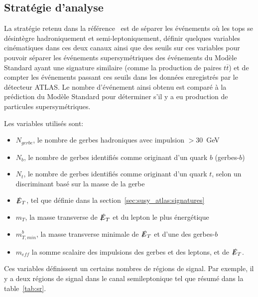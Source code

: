 \subsection{Stratégie d'analyse}
\label{sec:susy_atlas:gtt:strategie}

La stratégie retenu dans la référence~\cite{ATLAS-CONF-2015-067} est
de séparer les événements où les tops se désintègre hadroniquement et
semi-leptoniquement, définir quelques variables cinématiques dans ces
deux canaux ainsi que des seuils sur ces variables pour pouvoir
séparer les événements supersymétriques des événements du Modèle
Standard ayant une signature similaire (comme la production de paires
$t\overline{t}$) et de compter les événements passant ces seuils dans
les données enregistrés par le détecteur ATLAS. Le nombre d'événement
ainsi obtenu est comparé à la prédiction du Modèle
Standard pour déterminer s'il y a eu production de particules supersymétriques.

\noindent Les variables utilisés sont:

\begin{itemize}
\item $N_{gerbe}$, le nombre de gerbes hadroniques avec impulsion $> 30$~GeV
\item $N_b$, le nombre de gerbes identifiés comme originant d'un quark $b$ (gerbes-$b$)
\item $N_{t}$, le nombre de gerbes identifiés comme originant d'un
  quark $t$, selon un discriminant basé sur la masse de la gerbe
\item $\slashed{E}_T$, tel que définie dans la
  section~\ref{sec:susy_atlas:signatures}
\item $m_T$, la masse transverse de $\slashed{E}_T$ et du lepton le
  plus énergétique
\item $m_{T,min}^b$, la masse transverse minimale de $\slashed{E}_T$ et
  d'une des gerbes-$b$
\item $m_{eff}$ la somme scalaire des impulsions des gerbes et des leptons, et de $\slashed{E}_T$.

\end{itemize}

Ces variables définissent un certains nombres de régions de
signal. Par exemple, il y a deux régions de signal dans le canal
semileptonique tel que résumé dans la table~\ref{tab:sr}.

